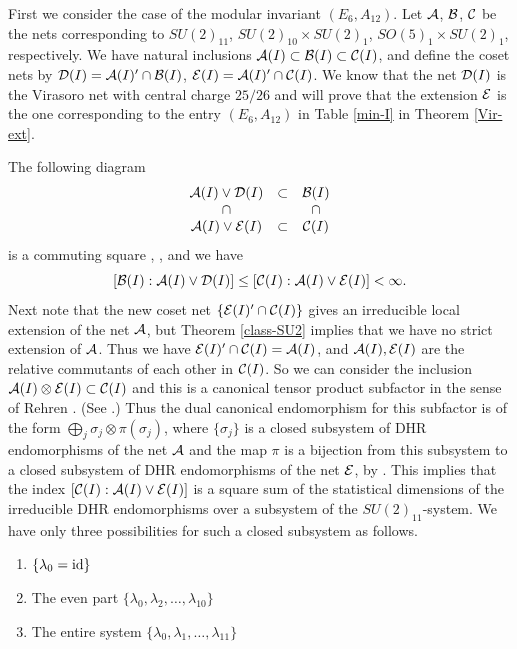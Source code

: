 \documentclass[12pt]{article}
\def\id{{\rm id}}
\def\la{\lambda}
\def\A{{\cal A}}
\def\B{{\cal B}}
\def\D{{\cal D}}
\def\E{{\cal E}}
\begin{document}
First we consider the case of the modular invariant $(E_6, A_{12})$.
Let $\A$, $\B$, ${\cal C}$ be the nets corresponding
to $SU(2)_{11}$, $SU(2)_{10}\times SU(2)_1$, $SO(5)_1 \times SU(2)_1$,
respectively.  We have natural inclusions $\A(I)\subset \B(I) \subset
{\cal C}(I)$, and define the coset nets by $\D(I)=\A(I)'\cap \B(I)$,
$\E(I)=\A(I)'\cap {\cal C}(I)$.  We know that the net $\D(I)$ is the
Virasoro net with central charge $25/26$ and will prove that
the extension $\E$ is the one corresponding to the entry
$(E_6, A_{12})$ in Table \ref{min-I} in Theorem \ref{Vir-ext}.

The following diagram 
$$\begin{array}{ccc}
\label{comm-sq}
\A(I) \vee \D(I) & \subset & \B(I) \\
\cap && \cap \\
\A(I) \vee \E(I) &\subset &{\cal C}(I)
\end{array}$$
is a commuting square \cite{P1}, \cite[Chapter 4]{GHJ}, and we have
\begin{equation}\label{ineq}
[\B(I): \A(I) \vee \D(I)] \le [{\cal C}(I): \A(I) \vee \E(I)] < \infty.
\end{equation}
Next note that the new coset net $\{\E(I)'\cap {\cal C}(I)\}$ gives
an irreducible local extension of the net $\A$, but
Theorem \ref{class-SU2} implies that we have no strict
extension of $\A$.  Thus we have $\E(I)'\cap {\cal C}(I)=\A(I)$,
and $\A(I), \E(I)$ are the relative commutants of each other
in ${\cal C}(I)$.  So we can consider the inclusion
$\A(I)\otimes \E(I)\subset {\cal C}(I)$ and this is a canonical
tensor product subfactor in the sense of Rehren \cite{R4,R5}.
(See \cite[line 22--24 in page 701]{R4}.)
Thus the dual canonical endomorphism for this subfactor
is of the form $\bigoplus_j \sigma_j\otimes\pi(\sigma_j)$,
where $\{\sigma_j\}$ is a closed subsystem of DHR endomorphisms
of the net $\A$ and the map $\pi$ is a bijection from
this subsystem to a closed subsystem of DHR endomorphisms
of the net $\E$, by \cite[Corollary 3.5, line 3--12 in page 706]{R4}.
This implies that the index   $[{\cal C}(I): \A(I) \vee \E(I)]$ is
a square sum of the statistical dimensions of the irreducible
DHR endomorphisms over a subsystem of the $SU(2)_{11}$-system.
We have only three possibilities for such a closed subsystem
as follows.
\begin{enumerate}
\item $\{\la_0=\id\}$
\item The even part $\{\la_0,\la_2,\dots,\la_{10}\}$
\item The entire system  $\{\la_0,\la_1,\dots,\la_{11}\}$
\end{enumerate}
\end{document}
